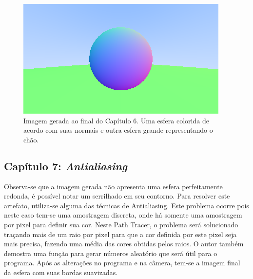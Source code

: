 \documentclass[journal]{IEEEtran}
\begin{document}
\begin{figure}[ht]
  \centering
  \includegraphics[width=\linewidth]{media/img-1.05-normals-sphere-ground.png}
  \caption{Imagem gerada ao final do Capítulo 6. Uma esfera colorida de acordo com suas normais e outra
  esfera grande representando o chão.}
  \label{img_sphere_normals}
\end{figure}

\subsection*{Capítulo 7: \emph{Antialiasing}}
Observa-se que a imagem gerada não apresenta uma esfera perfeitamente redonda, é possível notar um serrilhado
em seu contorno. Para resolver este artefato, utiliza-se alguma das técnicas de Antialiasing. Este problema
ocorre pois neste caso tem-se uma amostragem discreta, onde há somente uma amostragem por pixel para definir
sua cor. Neste Path Tracer, o problema será solucionado traçando mais de um raio por pixel para que a cor
definida por este pixel seja mais precisa, fazendo uma média das cores obtidas pelos raios. O autor também
demostra uma função para gerar números aleatório que será útil para o programa. Após as alterações no programa
e na câmera, tem-se a imagem final da esfera com suas bordas suavizadas.
\end{document}

